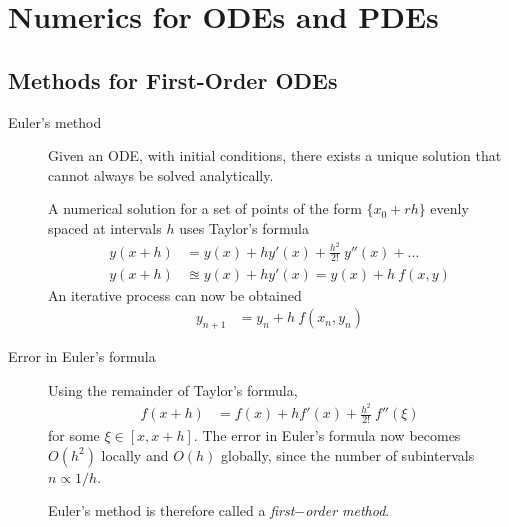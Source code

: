 \chapter{Numerics for ODEs and PDEs}

\section{Methods for First-Order ODEs}

\begin{description}
    \item[Euler's method] Given an ODE, with initial conditions, there exists a unique
        solution that cannot always be solved analytically. \par
        A numerical solution for a set of points of the form $ \{x_0 + rh\} $ evenly
        spaced at intervals $ h $ uses Taylor's formula
        \begin{align}
            y(x + h) & = y(x) + hy'(x) + \frac{h^2}{2!}\ y''(x) + \dots \\
            y(x+h)   & \approxeq y(x) + hy'(x) = y(x) + h\ f(x,y)
        \end{align}
        An iterative process can now be obtained
        \begin{align}
            y_{n+1} & = y_n + h\ f(x_n, y_n)
        \end{align}

    \item[Error in Euler's formula] Using the remainder of Taylor's formula,
        \begin{align}
            f(x + h) & = f(x) + hf'(x) + \frac{h^2}{2!}\ f''(\xi)
        \end{align}
        for some $ \xi \in [x, x+h] $. The error in Euler's formula now becomes
        $ O(h^2) $ locally and $ O(h) $ globally, since the number of subintervals
        $ n \propto 1/h $. \par
        Euler's method is therefore called a \emph{first$-$order method}.


\end{description}
